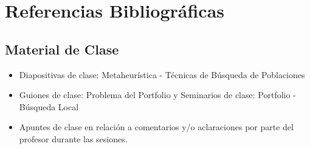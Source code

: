 \documentclass[12pt, a4paper]{article}
\begin{document}
\hypersetup{pageanchor=false}

\hypersetup{pageanchor=true}
\newpage

\tableofcontents
\newpage








\newpage
{}

\section*{Referencias Bibliográficas}

\subsection*{Material de Clase}
\begin{itemize}
    \item Diapositivas de clase: Metaheurística - Técnicas de Búsqueda de Poblaciones
    \item Guiones de clase: Problema del Portfolio y Seminarios de clase: Portfolio - Búsqueda Local
    \item Apuntes de clase en relación a comentarios y/o aclaraciones por parte del profesor durante las sesiones.
\end{itemize}
\end{document}
